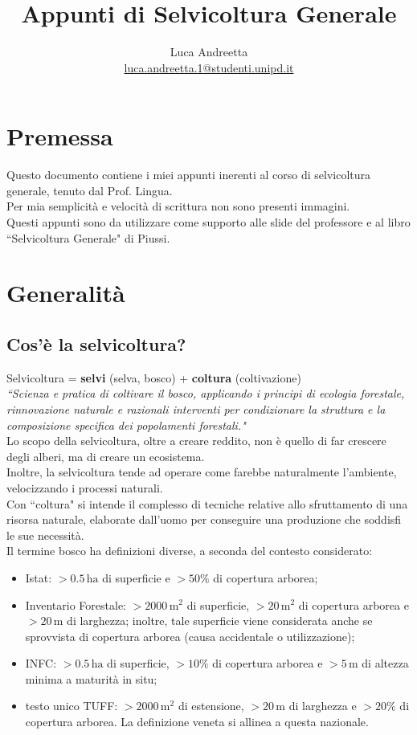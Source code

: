 \documentclass{article}
\title{Appunti di Selvicoltura Generale}
\author{Luca Andreetta \\
\href{mailto:luca.andreetta.1@studenti.unipd.it}{luca.andreetta.1@studenti.unipd.it} }
\date{}
\begin{document}
\maketitle

\section*{Premessa}
Questo documento contiene i miei appunti inerenti al corso di selvicoltura generale, tenuto dal Prof. Lingua.\\
Per mia semplicità e velocità di scrittura non sono presenti immagini.\\
Questi appunti sono da utilizzare come supporto alle slide del professore e al libro ``Selvicoltura Generale" di Piussi. 

\section{Generalità}
\subsection{Cos'è la selvicoltura?}

Selvicoltura = \textbf{selvi} (selva, bosco) + \textbf{coltura} (coltivazione)\\
\textit{``Scienza e pratica di coltivare il bosco, applicando i principi di ecologia forestale, rinnovazione naturale e razionali interventi per condizionare la struttura e la composizione specifica dei popolamenti forestali."}\\
Lo scopo della selvicoltura, oltre a creare reddito, non è quello di far crescere degli alberi, ma di creare un ecosistema.\\
Inoltre, la selvicoltura tende ad operare come farebbe naturalmente l'ambiente, velocizzando i processi naturali.\\
Con ``coltura" si intende il complesso di tecniche relative allo sfruttamento di una risorsa naturale, elaborate dall'uomo per conseguire una produzione che soddisfi le sue necessità.\\
Il termine bosco ha definizioni diverse, a seconda del contesto considerato:
\begin{itemize}
    \item Istat: $>0.5 \, \text{ha}$ di superficie e $>50\%$ di copertura arborea;
    \item Inventario Forestale: $>2000 \, \text{m}^2$ di superficie, $>20 \, \text{m}^2$ di copertura arborea e $>20 \, \text{m}$ di larghezza; inoltre, tale superficie viene considerata anche se sprovvista di copertura arborea (causa accidentale o utilizzazione);
    \item INFC: $>0.5 \, \text{ha}$ di superficie, $>10\%$ di copertura arborea e $>5 \, \text{m}$ di altezza minima a maturità in situ;
    \item testo unico TUFF: $>2000 \, \text{m}^2$ di estensione, $>20 \, \text{m}$ di larghezza e $>20\%$ di copertura arborea. La definizione veneta si allinea a questa nazionale.
\end{itemize}
\end{document}
